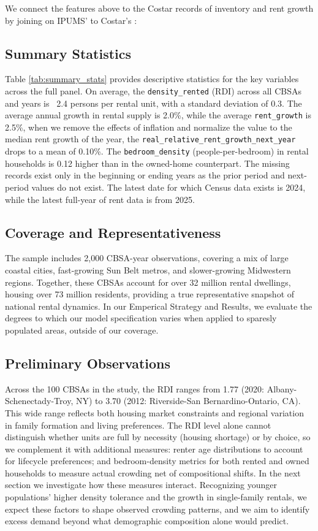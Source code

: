 \documentclass[pdflatex,sn-basic]{sn-jnl}%
\theoremstyle{thmstyleone}%
\theoremstyle{thmstyletwo}%
\theoremstyle{thmstylethree}%
\begin{document}
We connect the features above to the Costar records of inventory and rent growth by joining on IPUMS'  to Costar's :


\subsection{Summary Statistics}


Table \ref{tab:summary_stats} provides descriptive statistics for the key variables across the full panel. On average, the \texttt{density\_rented} (RDI) across all CBSAs and years is ~2.4 persons per rental unit, with a standard deviation of 0.3. The average annual growth in rental supply is 2.0\%, while the average \texttt{rent\_growth} is 2.5\%, when we remove the effects of inflation and normalize the value to the median rent growth of the year, the \texttt{real\_relative\_rent\_growth\_next\_year} drops to a mean of 0.10\%. The \texttt{bedroom\_density} (people-per-bedroom) in rental households is 0.12 higher than in the owned-home counterpart. The missing records exist only in the beginning or ending years as the prior period and next-period values do not exist. The latest date for which Census data exists is 2024, while the latest full-year of rent data is from 2025. 

\label{summary_stats}

\subsection{Coverage and Representativeness}
The sample includes 2,000 CBSA-year observations, covering a mix of large coastal cities, fast-growing Sun Belt metros, and slower-growing Midwestern regions. Together, these CBSAs account for over 32 million rental dwellings, housing over 73 million residents, providing a true representative snapshot of national rental dynamics. In our Emperical Strategy and Results, we evaluate the degrees to which our model specification varies when applied to sparesly populated areas, outside of our coverage. 

\subsection{Preliminary Observations}

Across the 100 CBSAs in the study, the RDI ranges from 1.77 (2020: Albany-Schenectady-Troy, NY) to 3.70 (2012: Riverside-San Bernardino-Ontario, CA). This wide range reflects both housing market constraints and regional variation in family formation and living preferences. The RDI level alone cannot distinguish whether units are full by necessity (housing shortage) or by choice, so we complement it with additional measures: renter age distributions to account for lifecycle preferences; and bedroom-density metrics for both rented and owned households to measure actual crowding net of compositional shifts. In the next section we investigate how these measures interact. Recognizing younger populations' higher density tolerance and the growth in single-family rentals, we expect these factors to shape observed crowding patterns, and we aim to identify excess demand beyond what demographic composition alone would predict.
\end{document}

